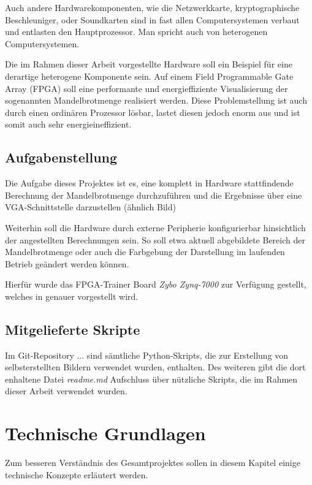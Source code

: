 \documentclass[a4paper,12pt,onesided]{report}
\begin{document}
Auch andere Hardwarekomponenten, wie die Netzwerkkarte, kryptographische Beschleuniger, oder Soundkarten sind in fast allen Computersystemen verbaut und entlasten den Hauptprozessor. Man spricht auch von heterogenen Computersystemen.

Die im Rahmen dieser Arbeit vorgestellte Hardware soll ein Beispiel für eine derartige heterogene Komponente sein. Auf einem Field Programmable Gate Array (FPGA) %
soll eine performante und energieffiziente Visualisierung der sogenannten Mandelbrotmenge realisiert werden. Diese Problemstellung ist auch durch einen ordinären Prozessor lösbar, lastet diesen jedoch enorm aus und ist somit auch sehr energieineffizient. %

\section{Aufgabenstellung}
\label{sec:aufgabenstellung}
Die Aufgabe dieses Projektes ist es, eine komplett in Hardware stattfindende Berechnung der Mandelbrotmenge durchzuführen und die Ergebnisse über eine VGA-Schnittstelle darzustellen (ähnlich Bild) %

Weiterhin soll die Hardware durch externe Peripherie konfigurierbar hinsichtlich der angestellten Berechnungen sein. So soll etwa aktuell abgebildete Bereich der Mandelbrotmenge oder auch die Farbgebung der Darstellung im laufenden Betrieb geändert werden können.

Hierfür wurde das FPGA-Trainer Board \textit{Zybo Zynq-7000} zur Verfügung gestellt, welches in %
genauer vorgestellt wird.

\section{Mitgelieferte Skripte}
Im Git-Repository ... sind sämtliche Python-Skripts, die zur Erstellung von selbsterstellten Bildern verwendet wurden, enthalten. Des weiteren gibt die dort enhaltene Datei \textit{readme.md} Aufschluss über nützliche Skripts, die im Rahmen dieser Arbeit verwendet wurden.

\chapter{Technische Grundlagen}
Zum besseren Verständnis des Gesamtprojektes sollen in diesem Kapitel einige technische Konzepte erläutert werden.
\end{document}
